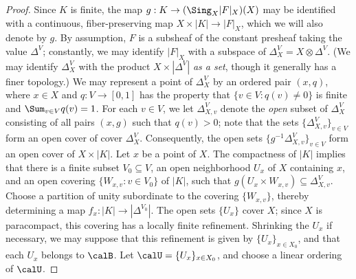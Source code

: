 \begin{proof}
Since $K$ is finite, the map $g: K \rightarrow (\Sing_X |F|_X)(X)$ may be identified with a continuous, fiber-preserving map $X \times |K| \rightarrow |F|_X$, which we will also denote by $g$.
By assumption, $F$ is a subsheaf of the constant presheaf taking the value $\Delta^{V}$; constantly, we may identify $|F|_X$ with a subspace of $\Delta^V_X = X \otimes \Delta^V$.
(We may identify $\Delta^V_{X}$ with the product
$X \times | \Delta^V |$ {\em as a set}, though it generally has a finer topology.) We may represent a point of $\Delta^V_{X}$ by an ordered pair $(x, q)$, where $x \in X$ and $q: V \rightarrow [0,1]$
has the property that $\{ v \in V: q(v) \neq 0\}$ is finite and 
$\Sum_{v \in V} q(v) = 1$. For each $v \in V$, we let $\Delta^V_{X,v}$ denote the {\em open} subset of $\Delta^V_{X}$ consisting of all pairs $(x,g)$ such that $q(v) > 0$; note that the sets
$\{ \Delta^V_{X,v}\}_{ v \in V}$ form an open cover of cover $\Delta^V_{X}$.
Consequently, the open sets $\{ g^{-1} \Delta^V_{X,v} \}_{v \in V}$ form an open cover of $X \times |K|$. Let $x$ be a point of $X$. The compactness of $|K|$ implies that there is a finite subset
$V_0 \subseteq V$, an open neighborhood $U_x$ of $X$ containing $x$, and an open covering
$\{ W_{x,v}: v \in V_0 \}$ of $|K|$, such that $g( U_x \times W_{x,v} ) \subseteq \Delta^V_{X,v}$.
Choose a partition of unity subordinate to the covering $\{ W_{x,v} \}$, thereby determining a map $f_{x}: |K| \rightarrow |\Delta^{V_0}|$. The open sets $\{ U_x \}$ cover $X$; since $X$ is paracompact, this covering has a locally finite refinement. Shrinking the $U_x$ if necessary, we may suppose that this refinement is given by $\{ U_{x} \}_{x \in X_0}$, and that each $U_{x}$ belongs to $\calB$. Let $\calU = \{ U_{x} \}_{x \in X_0}$, and choose a linear ordering of $\calU$.


\end{proof}
